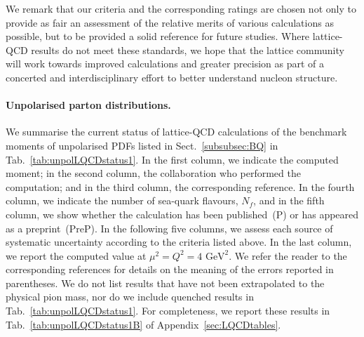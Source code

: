 We remark that our criteria and the corresponding ratings are chosen 
not only to provide as fair an assessment of the relative merits of various 
calculations as possible, but to be provided a solid reference for future studies.
%
Where lattice-QCD results do not meet these standards, we hope that the lattice 
community will work towards improved calculations and greater precision as 
part of a concerted and interdisciplinary effort to better understand
nucleon structure.

\paragraph{Unpolarised parton distributions.}
We summarise the current status of lattice-QCD calculations of the benchmark 
moments of unpolarised PDFs listed in Sect.~\ref{subsubsec:BQ} in 
Tab.~\ref{tab:unpolLQCDstatus1}. 
%
In the first column, we indicate the computed moment; in the second column,
the collaboration who performed the computation; and in the third column,
the corresponding reference.
%
In the fourth column, we indicate the number of sea-quark flavours, $N_f$, 
and in the fifth column, we show whether the calculation has been published~(P) 
or has appeared as a preprint~(PreP).
%
In the following five columns, we assess each source of systematic uncertainty
according to the criteria listed above. 
%
In the last column, we report the computed value at $\mu^2=Q^2=4\mbox{ GeV}^2$.
%
We refer the reader to the corresponding references for details on the 
meaning of the errors reported in parentheses.
%
We do not list results that have not been extrapolated to the physical pion 
mass, nor do we include quenched results in Tab.~\ref{tab:unpolLQCDstatus1}. 
%
For completeness, we report these results in Tab.~\ref{tab:unpolLQCDstatus1B} 
of Appendix~\ref{sec:LQCDtables}.

